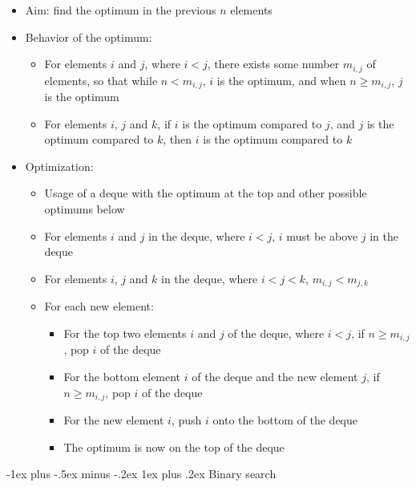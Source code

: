 \documentclass{article}
\makeatletter
\renewcommand{\subsubsection}{\@startsection{subsubsection}{3}{0mm}%
	{-1ex plus -.5ex minus -.2ex}%
	{1ex plus .2ex}%
	{\normalfont\small\bfseries}}
\makeatother
\begin{document}
\begin{landscape}
\begin{multicols}{2}
			\begin{itemize}
				\item Aim: find the optimum in the previous $n$ elements
				\item Behavior of the optimum:
				\begin{itemize}
					\item For elements $i$ and $j$, where $i<j$, there exists some number $m_{i,j}$ of elements, so that while $n<m_{i,j}$, $i$ is the optimum, and when $n\ge m_{i,j}$, $j$ is the optimum
					\item For elements $i$, $j$ and $k$, if $i$ is the optimum compared to $j$, and $j$ is the optimum compared to $k$, then $i$ is the optimum compared to $k$
				\end{itemize}
				\item Optimization:
				\begin{itemize}
					\item Usage of a deque with the optimum at the top and other possible optimums below
					\item For elements $i$ and $j$ in the deque, where $i<j$, $i$ must be above $j$ in the deque
					\item For elements $i$, $j$ and $k$ in the deque, where $i<j<k$, $m_{i,j}<m_{j,k}$
					\item For each new element:
					\begin{itemize}
						\item For the top two elements $i$ and $j$ of the deque, where $i<j$, if $n\ge m_{i,j}$, pop $i$ of the deque
						\item For the bottom element $i$ of the deque and the new element $j$, if $n\ge m_{i,j}$, pop $i$ of the deque
						\item For the new element $i$, push $i$ onto the bottom of the deque
						\item The optimum is now on the top of the deque
					\end{itemize}
				\end{itemize}
			\end{itemize}
		
			\subsubsection{Binary search}
			

\end{multicols}
\end{landscape}
\end{document}
